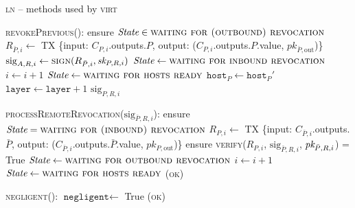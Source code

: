 \begin{center}
  \begin{processbox}{\textsc{ln} -- methods used by \textsc{virt}}
    \ \\
    \begin{algorithmic}[1]
      \State \textsc{revokePrevious}():
      \label{code:ln:methods-for-virt:revoke-previous}
      \Indent
        \State ensure $\itistate \in \textsc{waiting for (outbound)
        revocation}$
        \State $R_{\bar{P}, i} \gets$ TX \{input: $C_{P, i}$.outputs.$P$,
        output: ($C_{P, i}$.outputs.$P$.value, $pk_{\bar{P}, \mathrm{out}}$)\}
        \State $\mathrm{sig}_{A, R, i} \gets \textsc{sign}(R_{\bar{P}, i},
        \textit{sk}_{P, R, i})$
          \State $\itistate \gets \textsc{waiting for inbound revocation}$
        \Else \: 
          \State $i \gets i + 1$
          \State $\itistate \gets \textsc{waiting for hosts ready}$
        \EndIf
        \State $\texttt{host}_P \gets \texttt{host}_P'$ 
        \State $\texttt{layer} \gets \texttt{layer} + 1$
        \label{code:ln:methods-for-virt:host-update}
        \State \Return $\mathrm{sig}_{P, R, i}$
      \EndIndent
      \Statex

      \State \textsc{processRemoteRevocation}($\mathrm{sig}_{\bar{P}, R, i}$):
      \label{code:ln:methods-for-virt:process-remote-revocation}
      \Indent
        \State ensure $\itistate = \textsc{waiting for (inbound)
        revocation}$
        \State $R_{P, i} \gets$ TX \{input: $C_{\bar{P}, i}$.outputs.$\bar{P}$,
        output: ($C_{\bar{P}, i}$.outputs.$\bar{P}$.value, $pk_{P,
        \mathrm{out}}$)\}
        \State ensure \textsc{verify}($R_{P, i}$, $\mathrm{sig}_{\bar{P}, R,
        i}$, $\textit{pk}_{\bar{P}, R, i}$) = True
          \State $\itistate \gets \textsc{waiting for outbound
          revocation}$
        \Else \: 
          \State $i \gets i + 1$
          \State $\itistate \gets \textsc{waiting for hosts ready}$
        \EndIf
        \State \Return (\textsc{ok})
      \EndIndent
      \Statex

      \State \textsc{negligent}():
      \Indent
        \State $\texttt{negligent} \gets$ True
        \label{code:ln:methods-for-virt:negligent}
        \State \Return (\textsc{ok})
      \EndIndent
    \end{algorithmic}
  \end{processbox}
  \label{code:ln:methods-for-virt}
\end{center} \ \\

